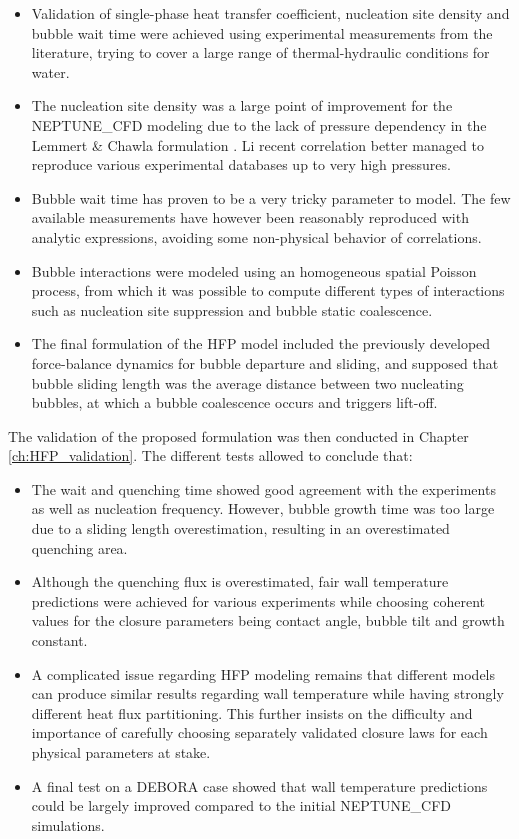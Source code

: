 \begin{itemize}
\item Validation of single-phase heat transfer coefficient, nucleation site density and bubble wait time were achieved using experimental measurements from the literature, trying to cover a large range of thermal-hydraulic conditions for water.

\item The nucleation site density was a large point of improvement for the NEPTUNE\_CFD modeling due to the lack of pressure dependency in the Lemmert \& Chawla formulation \cite{lemmert_influence_1977}. Li \etal \cite{li_development_2018} recent correlation better managed to reproduce various experimental databases up to very high pressures.

\item Bubble wait time has proven to be a very tricky parameter to model. The few available measurements have however been reasonably reproduced with analytic expressions, avoiding some non-physical behavior of correlations.

\item Bubble interactions were modeled using an homogeneous spatial Poisson process, from which it was possible to compute different types of interactions such as nucleation site suppression and bubble static coalescence. 

\item The final formulation of the HFP model included the previously developed force-balance dynamics for bubble departure and sliding, and supposed that bubble sliding length was the average distance between two nucleating bubbles, at which a bubble coalescence occurs and triggers lift-off.
\end{itemize}

The validation of the proposed formulation was then conducted in Chapter \ref{ch:HFP_validation}. The different tests allowed to conclude that:

\begin{itemize}
\item The wait and quenching time showed good agreement with the experiments as well as nucleation frequency. However, bubble growth time was too large due to a sliding length overestimation, resulting in an overestimated quenching area.
\item Although the quenching flux is overestimated, fair wall temperature predictions were achieved for various experiments while choosing coherent values for the closure parameters being contact angle, bubble tilt and growth constant.

\item A complicated issue regarding HFP modeling remains that different models can produce similar results regarding wall temperature while having strongly different heat flux partitioning. This further insists on the difficulty and importance of carefully choosing separately validated closure laws for each physical parameters at stake.

\item A final test on a DEBORA case showed that wall temperature predictions could be largely improved compared to the initial NEPTUNE\_CFD simulations.
\end{itemize}

